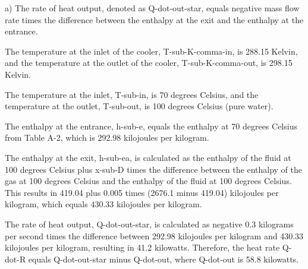 a) The rate of heat output, denoted as Q-dot-out-star, equals negative mass flow rate times the difference between the enthalpy at the exit and the enthalpy at the entrance.

The temperature at the inlet of the cooler, T-sub-K-comma-in, is 288.15 Kelvin, and the temperature at the outlet of the cooler, T-sub-K-comma-out, is 298.15 Kelvin.

The temperature at the inlet, T-sub-in, is 70 degrees Celsius, and the temperature at the outlet, T-sub-out, is 100 degrees Celsius (pure water).

The enthalpy at the entrance, h-sub-e, equals the enthalpy at 70 degrees Celsius from Table A-2, which is 292.98 kilojoules per kilogram.

The enthalpy at the exit, h-sub-ea, is calculated as the enthalpy of the fluid at 100 degrees Celsius plus x-sub-D times the difference between the enthalpy of the gas at 100 degrees Celsius and the enthalpy of the fluid at 100 degrees Celsius. This results in 419.04 plus 0.005 times (2676.1 minus 419.04) kilojoules per kilogram, which equals 430.33 kilojoules per kilogram.

The rate of heat output, Q-dot-out-star, is calculated as negative 0.3 kilograms per second times the difference between 292.98 kilojoules per kilogram and 430.33 kilojoules per kilogram, resulting in 41.2 kilowatts. Therefore, the heat rate Q-dot-R equals Q-dot-out-star minus Q-dot-out, where Q-dot-out is 58.8 kilowatts.